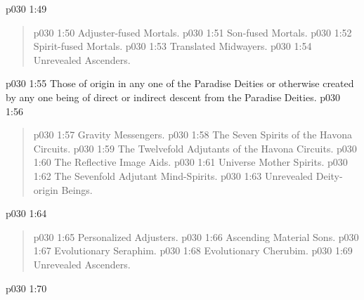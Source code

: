 \vsetspace
\vs p030 1:49 \bibnobreakspace {}
\begin{quote}
\vs p030 1:50 \bibnobreakspace Adjuster\hyp{}fused Mortals.
\vs p030 1:51 \bibnobreakspace Son\hyp{}fused Mortals.
\vs p030 1:52 \bibnobreakspace Spirit\hyp{}fused Mortals.
\vs p030 1:53 \bibnobreakspace Translated Midwayers.
\vs p030 1:54 \bibnobreakspace Unrevealed Ascenders.
\end{quote}
\vsetspace
\vs p030 1:55 \bibnobreakspace {} Those of origin in any one of the Paradise Deities or otherwise created by any one being of direct or indirect descent from the Paradise Deities.
\vsetspace
\vs p030 1:56 \bibnobreakspace {}
\begin{quote}
\vs p030 1:57 \bibnobreakspace Gravity Messengers.
\vs p030 1:58 \bibnobreakspace The Seven Spirits of the Havona Circuits.
\vs p030 1:59 \bibnobreakspace The Twelvefold Adjutants of the Havona Circuits.
\vs p030 1:60 \bibnobreakspace The Reflective Image Aids.
\vs p030 1:61 \bibnobreakspace Universe Mother Spirits.
\vs p030 1:62 \bibnobreakspace The Sevenfold Adjutant Mind\hyp{}Spirits.
\vs p030 1:63 \bibnobreakspace Unrevealed Deity\hyp{}origin Beings.
\end{quote}
\vsetspace
\vs p030 1:64 \bibnobreakspace {}
\begin{quote}
\vs p030 1:65 \bibnobreakspace Personalized Adjusters.
\vs p030 1:66 \bibnobreakspace Ascending Material Sons.
\vs p030 1:67 \bibnobreakspace Evolutionary Seraphim.
\vs p030 1:68 \bibnobreakspace Evolutionary Cherubim.
\vs p030 1:69 \bibnobreakspace Unrevealed Ascenders.
\end{quote}
\vsetspace
\vs p030 1:70 \bibnobreakspace {}
